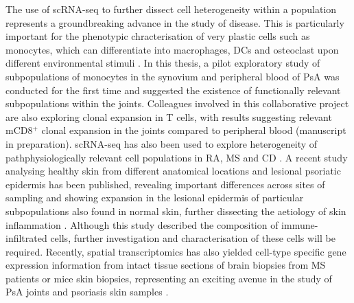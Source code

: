 The use of scRNA-seq to further dissect cell heterogeneity within a population represents a groundbreaking advance in the study of disease. This is particularly important for the phenotypic chracterisation of very plastic cells such as monocytes, which can differentiate into macrophages, DCs and osteoclast upon different environmental stimuli \parencite{Qu2014,Rivollier2012}. In this thesis, a pilot exploratory study of subpopulations of monocytes in the synovium and peripheral blood of PsA was conducted for the first time and suggested the existence of functionally relevant subpopulations within the joints. Colleagues involved in this collaborative project are also exploring clonal expansion in T cells, with results suggesting relevant mCD8$^+$ clonal expansion in the joints compared to peripheral blood (manuscript in preparation). scRNA-seq has also been used to explore heterogeneity of pathphysiologically relevant cell populations in RA, MS and CD \parencite{Fumitaka2018,Zhang2018,Schafflick2018}. A recent study analysing healthy skin from different anatomical locations and lesional psoriatic epidermis has been published, revealing important differences across sites of sampling and showing expansion in the lesional epidermis of particular subpopulations also found in normal skin, further dissecting the aetiology of skin inflammation \parencite{Cheng2018}. Although this study described the composition of immune-infiltrated cells, further investigation and characterisation of these cells will be required. Recently, spatial transcriptomics has also yielded cell-type specific gene expression information from intact tissue sections of brain biopsies from MS patients or mice skin biopsies,  representing an exciting avenue in the study of PsA joints and psoriasis skin samples \parencite{Itoh2018,Joost2016}. 





